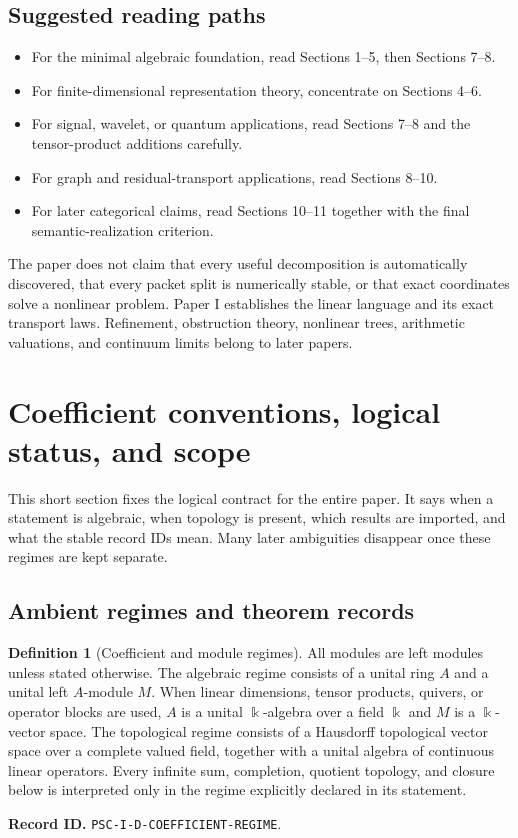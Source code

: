 \documentclass[11pt]{article}
\theoremstyle{definition}
\newtheorem{definition}[definition]{Definition}
\theoremstyle{remark}
\newcommand{\bbk}{\Bbbk}
\newcommand{\RecordID}[1]{\par\smallskip\noindent\begingroup\footnotesize\color{PSCGray}\raggedright\textbf{Record ID.} \nolinkurl{#1}.\par\endgroup}
\begin{document}
\subsection*{Suggested reading paths}
\begin{itemize}
\item For the minimal algebraic foundation, read Sections 1--5, then Sections 7--8.
\item For finite-dimensional representation theory, concentrate on Sections 4--6.
\item For signal, wavelet, or quantum applications, read Sections 7--8 and the tensor-product additions carefully.
\item For graph and residual-transport applications, read Sections 8--10.
\item For later categorical claims, read Sections 10--11 together with the final semantic-realization criterion.
\end{itemize}

\begin{warningbox}
The paper does not claim that every useful decomposition is automatically discovered, that every packet split is numerically stable, or that exact coordinates solve a nonlinear problem.  Paper I establishes the linear language and its exact transport laws.  Refinement, obstruction theory, nonlinear trees, arithmetic valuations, and continuum limits belong to later papers.
\end{warningbox}

\clearpage

\section{Coefficient conventions, logical status, and scope}
\begin{readerroadmap}
This short section fixes the logical contract for the entire paper.  It says when a statement is algebraic, when topology is present, which results are imported, and what the stable record IDs mean.  Many later ambiguities disappear once these regimes are kept separate.
\end{readerroadmap}
\subsection{Ambient regimes and theorem records}

\begin{definition}[Coefficient and module regimes]
\label{def:coefficient-regime}
All modules are left modules unless stated otherwise.  The algebraic regime consists of a unital ring $A$ and a unital left $A$-module $M$.  When linear dimensions, tensor products, quivers, or operator blocks are used, $A$ is a unital $\bbk$-algebra over a field $\bbk$ and $M$ is a $\bbk$-vector space.  The topological regime consists of a Hausdorff topological vector space over a complete valued field, together with a unital algebra of continuous linear operators.  Every infinite sum, completion, quotient topology, and closure below is interpreted only in the regime explicitly declared in its statement.
\end{definition}
\RecordID{PSC-I-D-COEFFICIENT-REGIME}
\end{document}
